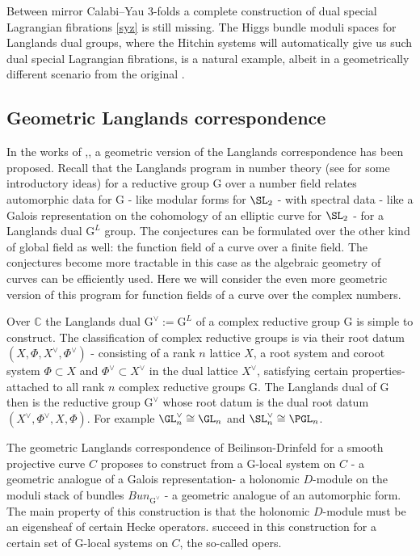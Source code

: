 \documentclass[12pt]{article}
\numberwithin{equation}{section}
\theoremstyle{remark}
\numberwithin{theorem}{section}
\def\C{\mathbb{C}}
\newcommand{\G}{\mathrm{G}}
\numberwithin{equation}{section}
\begin{document}
Between mirror Calabi--Yau $3$-folds a complete construction of dual special Lagrangian fibrations \eqref{syz} is still missing. The Higgs bundle moduli spaces for Langlands dual groups, where the Hitchin systems will automatically give us such dual special Lagrangian fibrations, is a natural example, albeit in a geometrically different scenario from the original \cite{strominger-etal}. 

\subsection{Geometric Langlands correspondence}
In the works of \cite{drinfeld1},\cite{laumon1},\cite{beilinson-drinfeld} a geometric version of the Langlands correspondence has been proposed. Recall that the Langlands program in number theory (see \cite{gelbart,frenkel} for some introductory ideas)  for a reductive group $\G$ over a number field relates automorphic data for $\G$ - like modular forms for $\SL_2$ - with spectral data - like a Galois representation on the cohomology of an elliptic curve for $\SL_2$ - for a Langlands dual $\G^L$ group.  The conjectures can be formulated over the other kind of global field as well: the function field of a curve over a finite field. The conjectures become more tractable in this case as the algebraic geometry of curves can be efficiently used. Here we will consider the even more geometric version of this program for function fields of a curve over the complex numbers. 

Over $\C$ the Langlands dual $\G^\vee:=\G^L$ of a complex reductive group $\G$ is simple to construct. The classification of complex reductive groups is via their root datum $(X,\Phi,X^\vee,\Phi^\vee)$ - consisting of
a rank $n$ lattice $X$, a root system and coroot system $\Phi\subset X$ and $\Phi^\vee\subset X^\vee$ in the dual lattice $X^\vee$, satisfying certain properties- attached to all rank $n$  complex reductive groups $\G$. The Langlands dual of $\G$ then is the reductive group $\G^\vee$ whose root datum is the dual root datum $(X^\vee,\Phi^\vee,X,\Phi).$ For example $\GL_n^\vee\cong \GL_n$ and $\SL_n^\vee\cong \PGL_n$. 

The geometric Langlands correspondence of Beilinson-Drinfeld  \cite{beilinson-drinfeld} for a smooth projective curve $C$  proposes to construct from a $\G$-local system on $C$ - a geometric analogue of a Galois representation- a holonomic $D$-module on the moduli stack of bundles  $Bun_{\G^\vee}$ - a geometric analogue of an automorphic form. The main property of this construction is that the holonomic $D$-module must be an eigensheaf of certain Hecke operators. \cite{beilinson-drinfeld} succeed in this construction for a certain set of $\G$-local systems on $C$, the so-called opers. 
\end{document}
